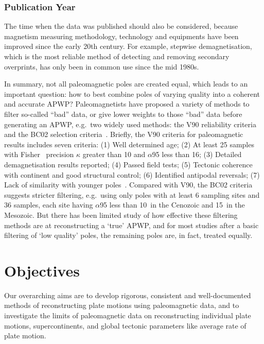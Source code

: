 \subsubsection{Publication Year}

The time when the data was published should also be considered, because
magnetism measuring methodology, technology and equipments have been improved
since the early 20th century. For example, stepwise demagnetisation, which is
the most reliable method of detecting and removing secondary overprints, has
only been in common use since the mid 1980s.

In summary, not all paleomagnetic poles are created equal, which leads to an
important question: how to best combine poles of varying quality into a
coherent and accurate APWP\@? Paleomagnetists have proposed a variety of methods
to filter so-called ``bad'' data, or give lower weights to those ``bad'' data
before generating an APWP, e.g.\ two widely used methods: the V90 reliability
criteria~\cite{v90} and the BC02 selection criteria~\cite{B02}.
Briefly, the V90 criteria for paleomagnetic results includes seven criteria:
(1) Well determined age; (2) At least 25 samples with Fisher~\cite{F53}
precision $\kappa$ greater than 10 and $\alpha$95 less than 16\degree; (3) Detailed
demagnetisation results reported; (4) Passed field tests; (5) Tectonic
coherence with continent and good structural control; (6) Identified antipodal
reversals; (7) Lack of similarity with younger poles~\cite{T92}.
Compared with V90, the BC02 criteria suggests stricter filtering, e.g.\ using
only poles with at least 6 sampling sites and 36 samples, each site having
$\alpha$95 less than 10\degree\ in the Cenozoic and 15\degree\ in the Mesozoic. But there has been
limited study of how effective these filtering methods are at reconstructing a
`true' APWP, and for most studies after a basic filtering of `low quality'
poles, the remaining poles are, in fact, treated equally.

\section{Objectives}

Our overarching aims are to develop rigorous, consistent and well-documented
methods of reconstructing plate motions using paleomagnetic data, and to
investigate the limits of paleomagnetic data on reconstructing individual plate
motions, supercontinents, and global tectonic parameters like average rate of
plate motion.

